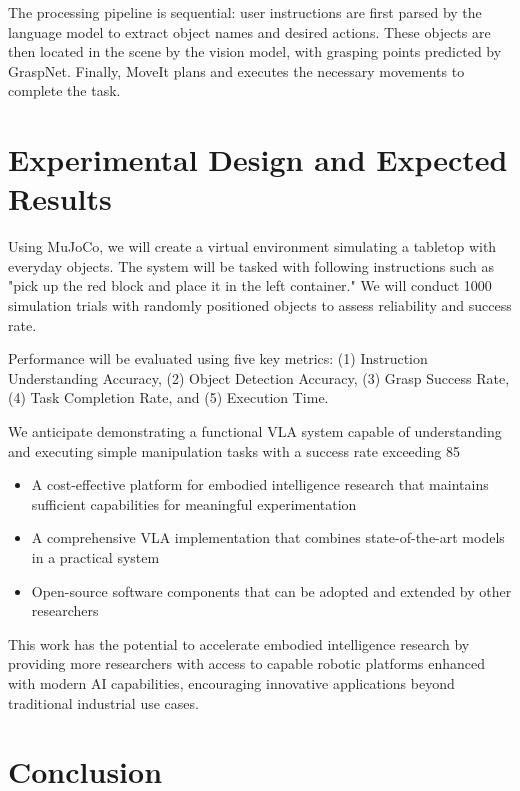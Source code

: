 \documentclass{article}
\begin{document}
The processing pipeline is sequential: user instructions are first parsed by the language model to extract object names and desired actions. These objects are then located in the scene by the vision model, with grasping points predicted by GraspNet. Finally, MoveIt plans and executes the necessary movements to complete the task.

\section{Experimental Design and Expected Results}

Using MuJoCo, we will create a virtual environment simulating a tabletop with everyday objects. The system will be tasked with following instructions such as "pick up the red block and place it in the left container." We will conduct 1000 simulation trials with randomly positioned objects to assess reliability and success rate.

Performance will be evaluated using five key metrics: (1) Instruction Understanding Accuracy, (2) Object Detection Accuracy, (3) Grasp Success Rate, (4) Task Completion Rate, and (5) Execution Time.

We anticipate demonstrating a functional VLA system capable of understanding and executing simple manipulation tasks with a success rate exceeding 85%

\begin{itemize}
    \item A cost-effective platform for embodied intelligence research that maintains sufficient capabilities for meaningful experimentation
    \item A comprehensive VLA implementation that combines state-of-the-art models in a practical system
    \item Open-source software components that can be adopted and extended by other researchers
\end{itemize}

This work has the potential to accelerate embodied intelligence research by providing more researchers with access to capable robotic platforms enhanced with modern AI capabilities, encouraging innovative applications beyond traditional industrial use cases.

\section{Conclusion}
\end{document}
